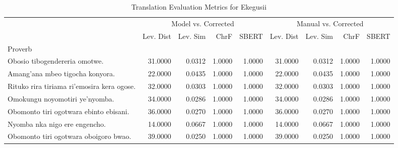\begin{table}
    \caption{Translation Evaluation Metrics for Ekegusii}
    \label{tab:ekegusii_eval}
    \begin{tabular}{lrrrrrrrr}
        \toprule                                             & \multicolumn{4}{c}{Model vs. Corrected} & \multicolumn{4}{c}{Manual vs. Corrected} \\
                                                             & Lev. Dist                               & Lev. Sim                                & ChrF   & SBERT  & Lev. Dist & Lev. Sim & ChrF   & SBERT  \\
        Proverb                                              &                                         &                                         &        &        &           &          &        &        \\
        \midrule Obosio tibogendereria omotwe.               & 31.0000                                 & 0.0312                                  & 1.0000 & 1.0000 & 31.0000   & 0.0312   & 1.0000 & 1.0000 \\
        Amang'ana mbeo tigocha konyora.                      & 22.0000                                 & 0.0435                                  & 1.0000 & 1.0000 & 22.0000   & 0.0435   & 1.0000 & 1.0000 \\
        Rituko rira tiriama ri’emosira kera ogose.           & 32.0000                                 & 0.0303                                  & 1.0000 & 1.0000 & 32.0000   & 0.0303   & 1.0000 & 1.0000 \\
        Omokungu noyomotiri ye'nyomba.                       & 34.0000                                 & 0.0286                                  & 1.0000 & 1.0000 & 34.0000   & 0.0286   & 1.0000 & 1.0000 \\
        Obomonto tiri ogotwara ebinto ebisani.               & 36.0000                                 & 0.0270                                  & 1.0000 & 1.0000 & 36.0000   & 0.0270   & 1.0000 & 1.0000 \\
        Nyomba nka nigo ere engencho.                        & 14.0000                                 & 0.0667                                  & 1.0000 & 1.0000 & 14.0000   & 0.0667   & 1.0000 & 1.0000 \\
        Obomonto tiri ogotwara oboigoro bwao.                & 39.0000                                 & 0.0250                                  & 1.0000 & 1.0000 & 39.0000   & 0.0250   & 1.0000 & 1.0000 \\

\end{tabular}
\end{table}
